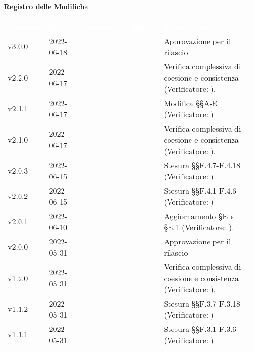 
{\LARGE{\textbf{Registro delle Modifiche}}} \\

\renewcommand{\arraystretch}{1.5}
\begin{longtable}{ m{}<{\centering}  m{}<{\centering}  m{}<{\centering}  m{}<{\centering}  m{}<{\centering} }
	\rowcolor{darkblue}
	\textcolor{white}{\textbf{Versione}} &\textcolor{white}{\textbf{Data}}& \textcolor{white}{\textbf{Nominativo}} & \textcolor{white}{\textbf{Ruolo}}&\textcolor{white}{\textbf{Descrizione}}\\

	v3.0.0 & 2022-06-18 & \MB & \RE & Approvazione per il rilascio \\

	v2.2.0 & 2022-06-17 & \FP & \VE & Verifica complessiva di coesione e consistenza (Verificatore: \textit{\MG}).\\

	v2.1.1 & 2022-06-17 & \FP & \VE & Modifica §§A-E (Verificatore: \textit{\MG})\\

	v2.1.0 & 2022-06-17 & \FP & \VE & Verifica complessiva di coesione e consistenza (Verificatore: \textit{\MG}).\\

	v2.0.3 & 2022-06-15 & \LW & \VE & Stesura §§F.4.7-F.4.18 (Verificatore: \textit{\MG})\\
	
	v2.0.2 & 2022-06-15 & \FP & \VE & Stesura §§F.4.1-F.4.6 (Verificatore: \textit{\MG})\\

	v2.0.1 & 2022-06-10 & \GC & \VE & Aggiornamento \S{E} e \S{E.1}  (Verificatore: \textit{\EP}).\\

	v2.0.0 & 2022-05-31 & \PV & \RE & Approvazione per il rilascio \\

	v1.2.0 & 2022-05-31 & \FP & \VE & Verifica complessiva di coesione e consistenza (Verificatore: \textit{\EP}).\\

	v1.1.2 & 2022-05-31 & \LW & \VE & Stesura §§F.3.7-F.3.18 (Verificatore: \textit{\EP})\\

	v1.1.1 & 2022-05-31 & \FP & \VE & Stesura §§F.3.1-F.3.6 (Verificatore: \textit{\EP})\\


\end{longtable}
